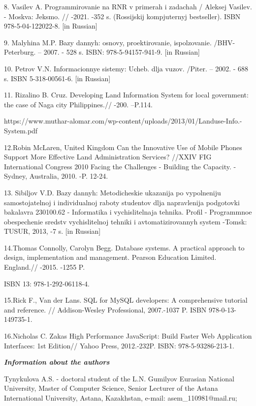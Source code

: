 8. Vasil\textquotesingle ev A. Programmirovanie na RNR v primerah i
zadachah / Aleksej Vasil\textquotesingle ev. - Moskva: Jeksmo. // -2021.
-352 s. (Rossijskij komp\textquotesingle juternyj bestseller). ISBN
978-5-04-122022-8. {[}in Russian{]}

9. Malyhina M.P. Bazy dannyh: osnovy, proektirovanie,
ispol\textquotesingle zovanie. /BHV-Peterburg. -- 2007. - 528 s. ISBN:
978-5-94157-941-9. {[}in Russian{]}

10. Petrov V.N. Informacionnye sistemy: Ucheb. dlja vuzov. /Piter. --
2002. - 688 s. ISBN 5-318-00561-6. {[}in Russian{]}

11. Rizalino B. Cruz. Developing Land Information System for local
government: the case of Naga city Philippines.// -200. --P.114.

https://www.muthar-alomar.com/wp-content/uploads/2013/01/Landuse-Info.-System.pdf

12.Robin McLaren, United Kingdom Can the Innovative Use of Mobile Phones
Support More Effective Land Administration Services? //XXIV FIG
International Congress 2010 Facing the Challenges - Building the
Capacity. - Sydney, Australia, 2010. -P. 12-24.

13. Sibiljov V.D. Bazy dannyh: Metodicheskie ukazanija po vypolneniju
samostojatel\textquotesingle noj i individual\textquotesingle noj raboty
studentov dlja napravlenija podgotovki bakalavra 230100.62 - Informatika
i vychislitel\textquotesingle naja tehnika. Profil\textquotesingle{} -
Programmnoe obespechenie sredstv vychislitel\textquotesingle noj tehniki
i avtomatizirovannyh system -Tomsk: TUSUR, 2013, -7 s. {[}in Russian{]}

14.Thomas Connolly, Carolyn Begg. Database systems. A practical approach
to design, implementation and management. Pearson Education Limited.
England.// -2015. -1255 P.

ISBN 13: 978-1-292-06118-4.

15.Rick F., Van der Lans. SQL for MySQL developers: A comprehensive
tutorial and reference. // Addison-Wesley Professional, 2007.-1037 P.
ISBN 978-0-13-149735-1.

16.Nicholas C. Zakas High Performance JavaScript: Build Faster Web
Application Interfaces: 1st Edition// Yahoo Press, 2012.-232P. ISBN:
978-5-93286-213-1.

\emph{\textbf{Information about the authors}}

Tynykulova A.S. - doctoral student of the L.N. Gumilyov Eurasian
National University, Master of Computer Science, Senior Lecturer of the
Astana International University, Astana, Kazakhstan, e-mail:
asem\_110981@mail.ru;

